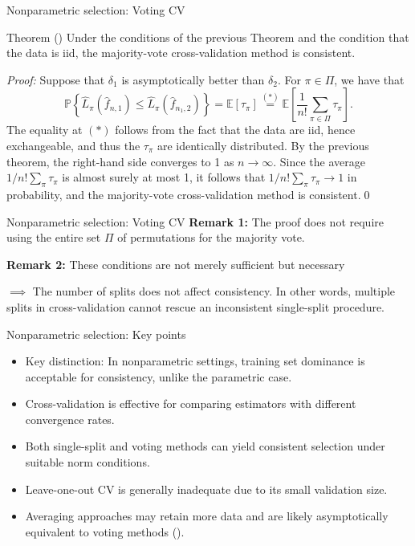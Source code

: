 \documentclass{beamer}
\newcommand{\0}{\emptyset}
\newcommand{\prob}{\mathbb{P}}
\newcommand{\Ep}[1]{\mathbb{E}\left[ #1 \right]}
\newcommand{\paren}[1]{\left(#1 \right)}
\newcommand{\set}[1]{\left\{ #1 \right\}}
\newcommand{\fhat}[2]{\hat{f}_{#1, #2}}
\newcommand{\1}{\mathmybb{1}}
\begin{document}
\begin{frame}{Nonparametric selection: Voting CV}
  \begin{block}{Theorem (\cite{yang_2007})}
    Under the conditions of the previous Theorem and the condition that the data is iid, the majority-vote cross-validation method is consistent.
  \end{block}

  \textit{Proof: }
  Suppose that \(\delta_{1}\) is asymptotically better than \(\delta_{2}\). For \(\pi\in \Pi\), we have that
  \[\prob\set{\hat{L}_{\pi}\paren{\fhat{n}{1}} \leq \hat{L}_{\pi}\paren{\fhat{n_{1}}{2}}} = \Ep{\tau_{\pi}} \stackrel{(*)}{=} \Ep{\frac{1}{n!}\sum_{\pi\in\Pi}\tau_{\pi}}.\]
  The equality at \((*)\) follows from the fact that the data are iid, hence exchangeable, and thus the \(\tau_\pi\) are identically distributed. By the previous theorem, the right-hand side converges to 1 as \(n\to\infty\). Since the average \(1/n! \sum_{\pi}\tau_{\pi}\) is almost surely at most 1, it follows that \(1/n! \sum_{\pi}\tau_{\pi} \to 1\) in probability, and the majority-vote cross-validation method is consistent.\qed{}
\end{frame}

\begin{frame}{Nonparametric selection: Voting CV}
  \textbf{Remark 1: } The proof does not require using the entire set \(\Pi\) of permutations for the majority vote. 
  
  \textbf{Remark 2: }These conditions are not merely sufficient but necessary
  
  \(\implies \) The number of splits does not affect consistency. In other words, multiple splits in cross-validation cannot rescue an inconsistent single-split procedure.
\end{frame}

\begin{frame}{Nonparametric selection: Key points}
  \begin{itemize}
    \item Key distinction: In nonparametric settings, training set dominance is acceptable for consistency, unlike the parametric case.
    \item Cross-validation is effective for comparing estimators with different convergence rates.
    \item Both single-split and voting methods can yield consistent selection under suitable norm conditions.
    \item Leave-one-out CV is generally inadequate due to its small validation size.
    \item Averaging approaches may retain more data and are likely asymptotically equivalent to voting methods (\cite{yang_2007}).
  \end{itemize}
\end{frame}
\end{document}

